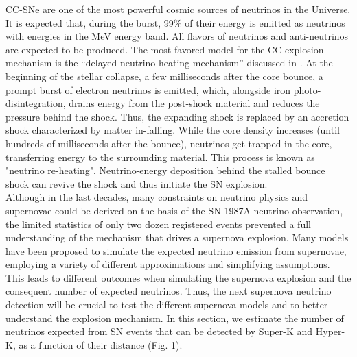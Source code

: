 \documentclass[twocolumn]{aastex631}
\begin{document}
CC-SNe are one of the most powerful cosmic sources of neutrinos in the Universe. It is expected that, during the burst,  99\% of their energy is emitted as neutrinos with energies in the MeV energy band.
All flavors of neutrinos and anti-neutrinos are expected to be produced. The most favored model for the CC explosion mechanism is the “delayed neutrino-heating mechanism” discussed in \cite{Bethe:1985sox}.
At the beginning of the stellar collapse, a few milliseconds after the core bounce, a prompt burst of electron neutrinos is emitted, which, alongside iron photo-disintegration, drains energy from the post-shock material and reduces the pressure behind the shock. Thus, the expanding shock is replaced by an accretion shock characterized by matter in-falling. 
While the core density increases (until hundreds of milliseconds after the bounce), neutrinos get trapped in the core, transferring energy to the surrounding material. This process is known as "neutrino re-heating". Neutrino-energy deposition behind the stalled bounce shock can revive the shock and thus initiate the SN explosion.\\
 Although in the last decades, many constraints on neutrino physics and supernovae could be derived on the basis of the SN 1987A neutrino observation, the limited statistics of only two dozen registered events prevented a full understanding of the mechanism that drives a supernova explosion. Many models have been proposed to simulate the expected neutrino emission from supernovae, employing a variety of different approximations and simplifying assumptions. This leads to different outcomes when simulating the supernova explosion and the consequent number of expected neutrinos. Thus, the next supernova neutrino detection will be crucial to test the different supernova models and to better understand the explosion mechanism. In this section, we estimate the number of neutrinos expected from SN events that can be detected by Super-K and Hyper-K, as a function of their distance (Fig. 1). 
\end{document}

